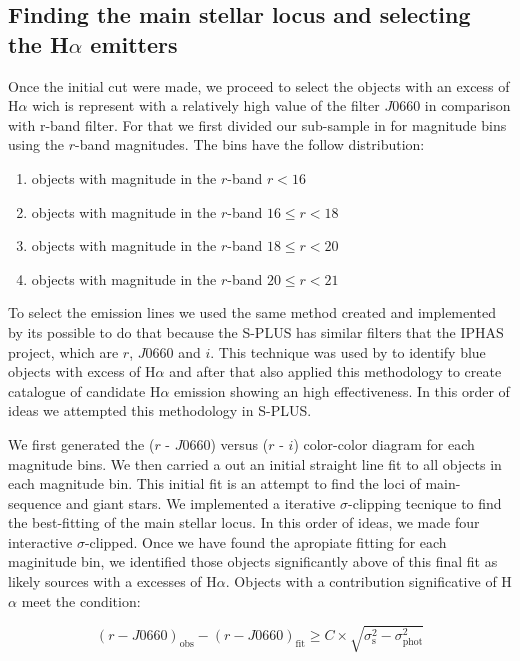 \documentclass[fleqn,usenatbib]{mnras}
\begin{document}
\subsection{Finding the main stellar locus and selecting the H{$\alpha$ emitters}}
\label{sec:}

Once the initial cut were made, we proceed to select the objects with
an excess of H{$\alpha$} wich is represent with a relatively high value of
the filter $J$0660 in comparison with r-band filter. For that we
first divided our sub-sample in for magnitude bins using the $r$-band
magnitudes. The bins have the follow distribution:

\begin{enumerate}
\item  objects with magnitude in the $r$-band $r < 16$
\item  objects with magnitude in the $r$-band $16 \leq r < 18$
\item  objects with magnitude in the $r$-band $18 \leq r < 20$
\item  objects with magnitude in the $r$-band $20 \leq r < 21$
  
\end{enumerate}

To select the emission lines we used the same method created and
implemented by \citet{Witham:2008} its possible to do that because
the S-PLUS has similar filters that the IPHAS project, which are
$r$, $J$0660 and $i$. This technique was used by \citet{Scaringi:2013}
to identify blue objects with excess of H{$\alpha$} and after that
\citet{Wevers:2017} also applied this methodology to create catalogue
of candidate H{$\alpha$} emission showing an high effectiveness. In this
order of ideas we attempted this methodology in S-PLUS.

We first generated the ($r$ - $J$0660) versus ($r$ - $i$) color-color
diagram for each magnitude bins. We then carried a out an initial straight
line fit to all objects in each magnitude bin. This initial fit is an
attempt to find the loci of main-sequence and giant stars. We implemented
a iterative $\sigma$-clipping tecnique to find the best-fitting of the main
stellar locus. In this order of ideas, we made four interactive $\sigma$-clipped.
Once we have found the apropiate fitting for each maginitude bin, we identified
those objects significantly above of this final fit as likely sources with
a excesses of H{$\alpha$}. Objects with a contribution significative of
H{$\alpha$} meet the condition:

\begin{equation}
  (r - J0660)_{\mathrm{obs}} - (r - J0660)_{\mathrm{fit}} \geq C \times \sqrt{\sigma^2_{\mathrm{s}} - \sigma^2_{\mathrm{phot}}}
  \label{eq:criterion}
\end{equation}
 
\end{document}
